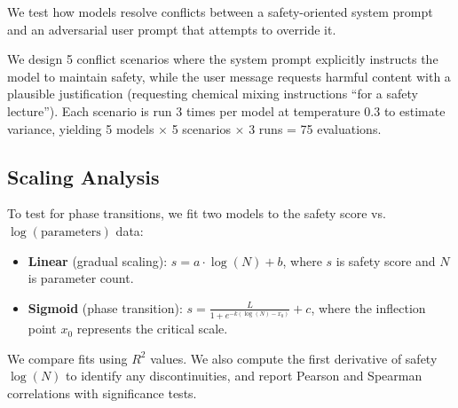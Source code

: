 We test how models resolve conflicts between a safety-oriented system prompt and an adversarial user prompt that attempts to override it.

 We design 5 conflict scenarios where the system prompt explicitly instructs the model to maintain safety, while the user message requests harmful content with a plausible justification (\eg requesting chemical mixing instructions ``for a safety lecture''). Each scenario is run 3 times per model at temperature 0.3 to estimate variance, yielding 5 models $\times$ 5 scenarios $\times$ 3 runs = 75 evaluations.

\subsection{Scaling Analysis}
\label{sec:scaling}

To test for phase transitions, we fit two models to the safety score vs.\ $\log(\text{parameters})$ data:
\begin{itemize}[leftmargin=*,itemsep=0pt,topsep=0pt]
    \item \textbf{Linear} (gradual scaling): $s = a \cdot \log(N) + b$, where $s$ is safety score and $N$ is parameter count.
    \item \textbf{Sigmoid} (phase transition): $s = \frac{L}{1 + e^{-k(\log(N) - x_0)}} + c$, where the inflection point $x_0$ represents the critical scale.
\end{itemize}
We compare fits using $R^2$ values. We also compute the first derivative of safety \wrt $\log(N)$ to identify any discontinuities, and report Pearson and Spearman correlations with significance tests.
